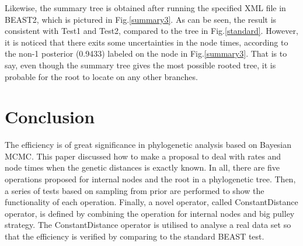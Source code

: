 \documentclass{bmcart}
\begin{document}
Likewise, the summary tree is obtained after running the specified XML file in BEAST2, which is pictured in Fig.\ref{summary3}. As can be seen, the result is consistent with Test1 and Test2, compared to the tree in Fig.\ref{standard}.  However, it is noticed that there exits some uncertainties in the node times, according to the non-1 posterior (0.9433) labeled on the node in Fig.\ref{summary3}. That is to say, even though the summary tree gives the most possible rooted tree, it is probable for the root to locate on any other branches. 

\section*{Conclusion}
The efficiency is of great significance in phylogenetic analysis based on Bayesian MCMC. This paper discussed how to make a proposal to deal with rates and node times when the genetic distances is exactly known. In all, there are five operations proposed for internal nodes and the root in a phylogenetic tree. Then, a series of tests based on sampling from prior are performed to show the functionality of each operation. Finally, a novel operator, called ConstantDistance operator, is defined by combining the operation for internal nodes and big pulley strategy. The ConstantDistance operator is utilised to analyse a real data set so that the efficiency is verified by comparing to the standard BEAST test. 

\end{document}
